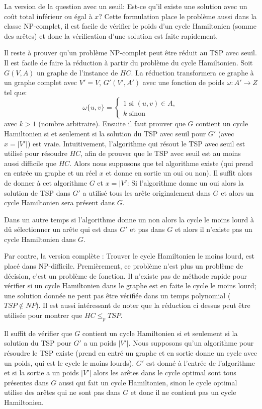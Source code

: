 \documentclass[../main.tex]{subfiles}
\begin{document}
La version de la question avec un seuil: Est-ce qu'il existe une solution avec un coût total inférieur ou égal à $x$? Cette formulation place le problème aussi dans la classe NP-complet, il est facile de vérifier le poids d'un cycle Hamiltonien (somme des arêtes) et donc la vérification d'une solution est faite rapidement.

Il reste à prouver qu'un problème NP-complet peut être réduit au TSP avec seuil. Il est facile de faire la réduction à partir du problème du cycle Hamiltonien. Soit $G(V,A)$ un graphe de l'instance de $HC$. La réduction transformera ce graphe à un graphe complet avec $V'=V$, $G'(V', A')$ avec une fonction de poids $\omega: A' \rightarrow Z$ tel que:
\[
\omega \{u, v\} = \begin{cases}
\text{1 si } (u,v)\in A,\\
k \text{ sinon}
\end{cases}
\]
avec $k > 1$ (nombre arbitraire). Ensuite il faut prouver que $G$ contient un cycle Hamiltonien si et seulement si la solution du TSP avec seuil pour $G'$ (avec $x=|V'|$) est vraie. Intuitivement, l'algorithme qui résout le TSP avec seuil est utilisé pour résoudre $HC$, afin de prouver que le TSP avec seuil est au moins aussi difficile que $HC$. Alors nous supposons que tel algorithme existe (qui prend en entrée un graphe et un réel $x$ et donne en sortie un oui ou non). Il suffit alors de donner à cet algorithme $G$ et $x=|V'$: Si l'algorithme donne un oui alors la solution de TSP dans $G'$ a utilisé tous les arête originalement dans $G$ et alors un cycle Hamiltonien sera présent dans $G$.

Dans un autre temps si l'algorithme donne un non alors la cycle le moins lourd à dû sélectionner un arête qui est dans $G'$ et pas dans $G$ et alors il n'existe pas un cycle Hamiltonien dans $G$.

Par contre, la version \og complète \fg{}: Trouver le cycle Hamiltonien le moins lourd, est placé dans NP-difficile. Premièrement, ce problème n'est plus un problème de décision, c'est un problème de fonction. Il n'existe pas de méthode rapide pour vérifier si un cycle Hamiltonien dans le graphe est en faite le cycle le moins lourd; une solution donnée ne peut pas être vérifiée dans un temps polynomial ($TSP \notin NP$). Il est aussi intéressant de noter que la réduction ci dessus peut être utilisée pour montrer que $HC \leq _p TSP$.

Il suffit de vérifier que $G$ contient un cycle Hamiltonien si et seulement si la solution du TSP pour $G'$ a un poids $|V'|$. Nous supposons qu'un algorithme pour résoudre le TSP existe (prend en entré un graphe et en sortie donne un cycle avec un poids, qui est le cycle le moins lourds). $G'$ est donné à l'entrée de l'algorithme et si la sortie a un poids $|V'|$ alors les arêtes dans le cycle optimal sont tous présentes dans $G$ aussi qui fait un cycle Hamiltonien, sinon le cycle optimal utilise des arêtes qui ne sont pas dans $G$ et donc il ne contient pas un cycle Hamiltonien.
\end{document}
